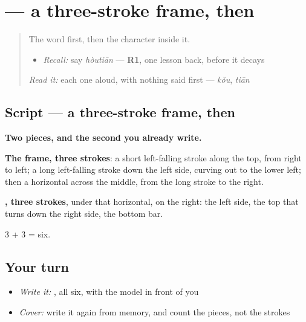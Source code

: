 \section[\texorpdfstring{\zh{后} (hòu)}{后 (hòu)}]{ — a three-stroke frame, then }

\label{lesson:ZH-W147-hou-after}



\begin{quote}
The word first, then the character inside it.

\begin{itemize}
\raggedright
  \item \emph{Recall:} say \emph{hòutiān} — \textbf{R1}, one lesson back, before it decays
\end{itemize}

\begin{quote}
 
\end{quote}

\emph{Read it:} each one aloud, with nothing said first — \emph{kǒu}, \emph{tiān}
\end{quote}

\subsection*{Script — a three-stroke frame, then }

\begin{quote}
\end{quote}

\textbf{Two pieces, and the second you already write.}

\textbf{The frame, three strokes}: a short left-falling stroke along the top, from right to left; a long left-falling stroke down the left side, curving out to the lower left; then a horizontal across the middle, from the long stroke to the right.

\textbf{, three strokes}, under that horizontal, on the right: the left side, the top that turns down the right side, the bottom bar.

3 + 3 = six.

\subsection*{Your turn}
\begin{itemize}
\raggedright
  \item \emph{Write it:} , all six, with the model in front of you
  \item \emph{Cover:} write it again from memory, and count the pieces, not the strokes
\end{itemize}

